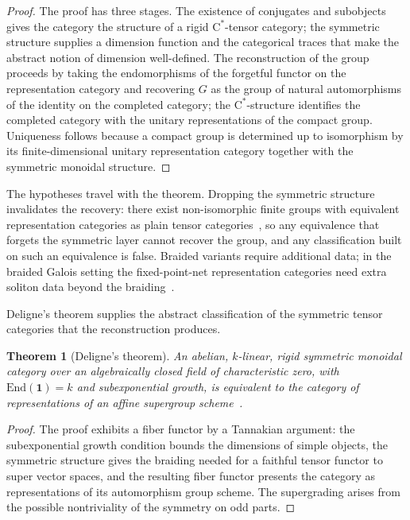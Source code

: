\documentclass[11pt,letterpaper]{article}
\newtheorem{theorem}{Theorem}[section]
\theoremstyle{definition}
\theoremstyle{remark}
\begin{document}
\begin{proof}
The proof has three stages. The existence of conjugates and subobjects gives the category the structure of a rigid $\mathrm{C}^*$-tensor category; the symmetric structure supplies a dimension function and the categorical traces that make the abstract notion of dimension well-defined. The reconstruction of the group proceeds by taking the endomorphisms of the forgetful functor on the representation category and recovering $G$ as the group of natural automorphisms of the identity on the completed category; the $\mathrm{C}^*$-structure identifies the completed category with the unitary representations of the compact group. Uniqueness follows because a compact group is determined up to isomorphism by its finite-dimensional unitary representation category together with the symmetric monoidal structure.
\end{proof}

The hypotheses travel with the theorem. Dropping the symmetric structure invalidates the recovery: there exist non-isomorphic finite groups with equivalent representation categories as plain tensor categories~\cite{etingof-gelaki}, so any equivalence that forgets the symmetric layer cannot recover the group, and any classification built on such an equivalence is false. Braided variants require additional data; in the braided Galois setting the fixed-point-net representation categories need extra soliton data beyond the braiding~\cite{mueger}.

Deligne's theorem supplies the abstract classification of the symmetric tensor categories that the reconstruction produces.

\begin{theorem}[Deligne's theorem]
\label{thm:deligne}
An abelian, $k$-linear, rigid symmetric monoidal category over an algebraically closed field of characteristic zero, with $\mathrm{End}(\mathbf{1}) = k$ and subexponential growth, is equivalent to the category of representations of an affine supergroup scheme~\cite{deligne}.
\end{theorem}

\begin{proof}
The proof exhibits a fiber functor by a Tannakian argument: the subexponential growth condition bounds the dimensions of simple objects, the symmetric structure gives the braiding needed for a faithful tensor functor to super vector spaces, and the resulting fiber functor presents the category as representations of its automorphism group scheme. The supergrading arises from the possible nontriviality of the symmetry on odd parts.
\end{proof}
\end{document}
